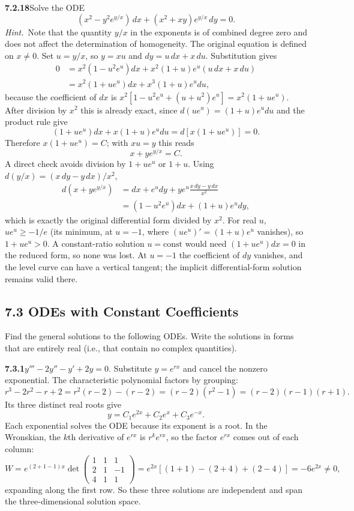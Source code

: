 \par\bigskip
\noindent\textbf{7.2.18}\quad Solve the ODE
\[
(x^{2}-y^{2}e^{y/x})\,dx+(x^{2}+xy)e^{y/x}\,dy=0.
\]
\emph{Hint.}~Note that the quantity $y/x$ in the exponents is of combined
degree zero and does not affect the determination of homogeneity.
\solution
The original equation is defined on $x\ne0$. Set $u=y/x$, so
$y=xu$ and $dy=u\,dx+x\,du$. Substitution gives
\begin{align*}
0&=x^2(1-u^2e^u)dx+x^2(1+u)e^u(u\,dx+x\,du)\\
 &=x^2(1+ue^u)dx+x^3(1+u)e^u du,
\end{align*}
because the coefficient of $dx$ is
$x^2[1-u^2e^u+(u+u^2)e^u]=x^2(1+ue^u)$.
After division by $x^2$ this is already exact, since
$d(ue^u)=(1+u)e^udu$ and the product rule give
\[
(1+ue^u)dx+x(1+u)e^u du=d[x(1+ue^u)]=0.
\]
Therefore $x(1+ue^u)=C$; with $xu=y$ this reads
\[
\boxed{x+ye^{y/x}=C}.
\]
A direct check avoids division by $1+ue^u$ or $1+u$. Using
$d(y/x)=(x\,dy-y\,dx)/x^2$,
\begin{align*}
d(x+ye^{y/x})&=dx+e^u dy+ye^u\frac{x\,dy-y\,dx}{x^2}\\
&=(1-u^2e^u)dx+(1+u)e^u dy,
\end{align*}
which is exactly the original differential form divided by $x^2$.
For real $u$, $ue^u\ge-1/e$ (its minimum, at $u=-1$, where
$(ue^u)'=(1+u)e^u$ vanishes), so $1+ue^u>0$. A constant-ratio solution
$u=\text{const}$ would need $(1+ue^u)dx=0$ in the reduced form, so none
was lost. At $u=-1$ the coefficient of $dy$ vanishes, and the level curve
can have a vertical tangent; the implicit differential-form solution
remains valid there.

\subsection*{7.3 ODEs with Constant Coefficients}

Find the general solutions to the following ODEs. Write the solutions in forms
that are entirely real (i.e., that contain no complex quantities).

\par\bigskip
\noindent\textbf{7.3.1}\quad $y'''-2y''-y'+2y=0$.
\solution
Substitute $y=e^{rx}$ and cancel the nonzero exponential. The
characteristic polynomial factors by grouping:
\[
r^3-2r^2-r+2=r^2(r-2)-(r-2)=(r-2)(r^2-1)=(r-2)(r-1)(r+1).
\]
Its three distinct real roots give
\[
\boxed{y=C_1e^{2x}+C_2e^x+C_3e^{-x}}.
\]
Each exponential solves the ODE because its exponent is a root.
In the Wronskian, the $k$th derivative of $e^{rx}$ is $r^ke^{rx}$, so
the factor $e^{rx}$ comes out of each column:
\[
W=e^{(2+1-1)x}\det\begin{pmatrix}1&1&1\\2&1&-1\\4&1&1\end{pmatrix}
=e^{2x}[(1+1)-(2+4)+(2-4)]=-6e^{2x}\ne0,
\]
expanding along the first row. So these three solutions are
independent and span the three-dimensional solution space.

